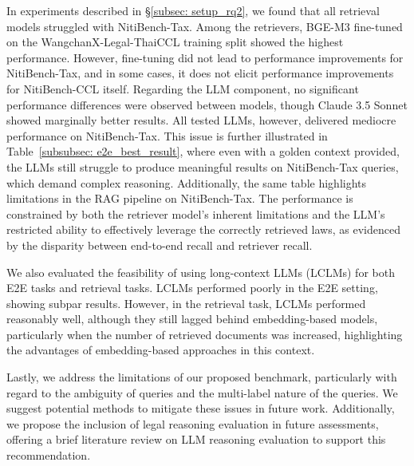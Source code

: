 In experiments described in \S\ref{subsec: setup_rq2}, we found that all retrieval models struggled with NitiBench-Tax. Among the retrievers, BGE-M3 fine-tuned on the WangchanX-Legal-ThaiCCL training split showed the highest performance. However, fine-tuning did not lead to performance improvements for NitiBench-Tax, and in some cases, it does not elicit performance improvements for NitiBench-CCL itself. Regarding the LLM component, no significant performance differences were observed between models, though Claude 3.5 Sonnet showed marginally better results. All tested LLMs, however, delivered mediocre performance on NitiBench-Tax. This issue is further illustrated in Table~\ref{subsubsec: e2e_best_result}, where even with a golden context provided, the LLMs still struggle to produce meaningful results on NitiBench-Tax queries, which demand complex reasoning. Additionally, the same table highlights limitations in the RAG pipeline on NitiBench-Tax. The performance is constrained by both the retriever model’s inherent limitations and the LLM's restricted ability to effectively leverage the correctly retrieved laws, as evidenced by the disparity between end-to-end recall and retriever recall.

We also evaluated the feasibility of using long-context LLMs (LCLMs) for both E2E tasks and retrieval tasks. LCLMs performed poorly in the E2E setting, showing subpar results. However, in the retrieval task, LCLMs performed reasonably well, although they still lagged behind embedding-based models, particularly when the number of retrieved documents was increased, highlighting the advantages of embedding-based approaches in this context.

Lastly, we address the limitations of our proposed benchmark, particularly with regard to the ambiguity of queries and the multi-label nature of the queries. We suggest potential methods to mitigate these issues in future work. Additionally, we propose the inclusion of legal reasoning evaluation in future assessments, offering a brief literature review on LLM reasoning evaluation to support this recommendation.


